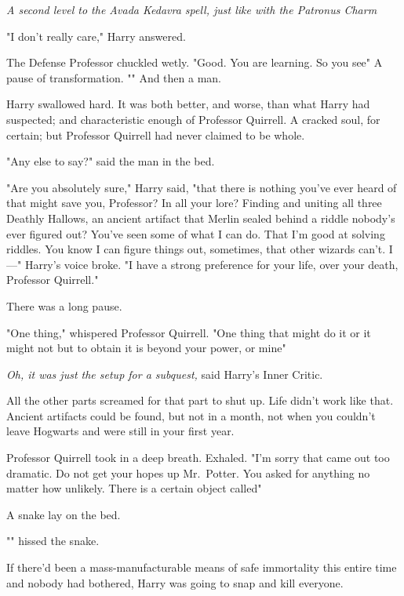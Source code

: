 \emph{A second level to the Avada Kedavra spell, just like with the Patronus
Charm{\el}}

"I don't really care," Harry answered.

The Defense Professor chuckled wetly. "Good. You are{\el} learning. So you
see{\el}" A pause of transformation. "" And then a man.

Harry swallowed hard. It was both better, and worse, than what Harry had
suspected; and characteristic enough of Professor Quirrell. A cracked soul, for
certain; but Professor Quirrell had never claimed to be whole.

"Any else{\el} to say?" said the man in the bed.

"Are you absolutely sure," Harry said, "that there is nothing you've ever heard
of that might save you, Professor? In all your lore? Finding and uniting all
three Deathly Hallows, an ancient artifact that Merlin sealed behind a riddle
nobody's ever figured out? You've seen some of what I can do. That I'm good at
solving riddles. You know I can figure things out, sometimes, that other
wizards can't. I—" Harry's voice broke. "I have a strong preference for your
life, over your death, Professor Quirrell."

There was a long pause.

"One thing," whispered Professor Quirrell. "One thing{\el} that might do
it{\el} or it might not{\el} but to obtain it{\el} is beyond your
power, or mine{\el}"

\emph{Oh, it was just the setup for a subquest,} said Harry's Inner Critic.

All the other parts screamed for that part to shut up. Life didn't work like
that. Ancient artifacts could be found, but not in a month, not when you
couldn't leave Hogwarts and were still in your first year.

Professor Quirrell took in a deep breath. Exhaled. "I'm sorry{\el} that came
out{\el} too dramatic. Do not{\el} get your hopes up{\el} Mr.~Potter.
You asked{\el} for anything{\el} no matter how unlikely. There is{\el}
a certain object{\el} called{\el}"

A snake lay on the bed.

"" hissed the snake.

If there'd been a mass-manufacturable means of safe immortality this entire
time and nobody had bothered, Harry was going to snap and kill everyone.

